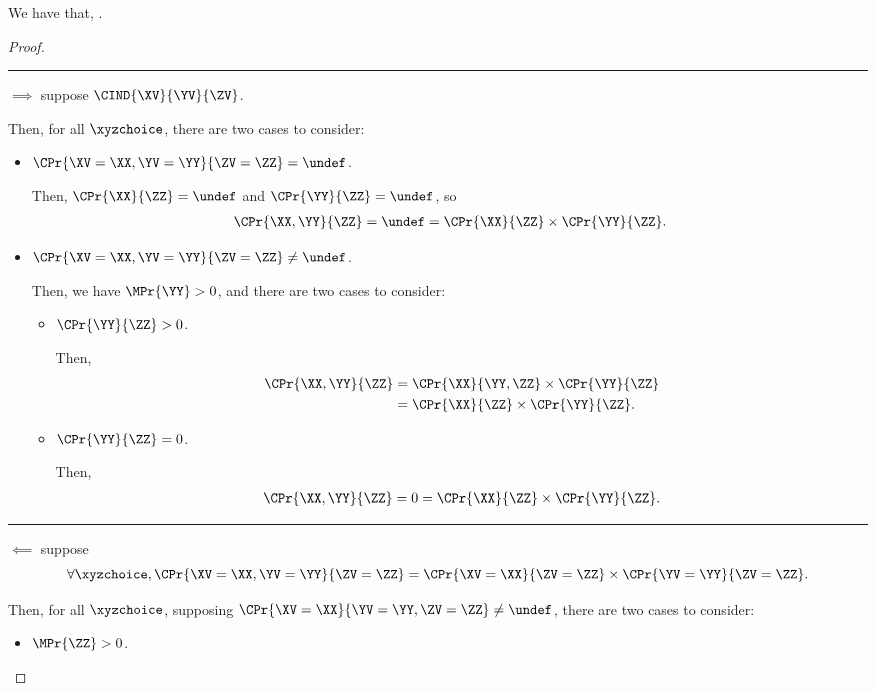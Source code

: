 \begin{proposition}
  We have that, \indproddef.%
\end{proposition}

\begin{proof}
  \hrule
  $\implies$ suppose $\CIND{\XV}{\YV}{\ZV}$.

  Then, for all $\xyzchoice$, there are two cases to consider:
  \begin{itemize}
    \item $\CPr{\XV = \XX, \YV = \YY}{\ZV = \ZZ} = \undef$.

      Then, 
      $\CPr{\XX}{\ZZ} = \undef$
      and
      $\CPr{\YY}{\ZZ} = \undef$, so
      \begin{align*}
        \CPr{\XX, \YY}{\ZZ}  = \undef =
        \CPr{\XX}{\ZZ} \times \CPr{\YY}{\ZZ}.
      \end{align*}
    \item $\CPr{\XV = \XX, \YV = \YY}{\ZV = \ZZ} \ne \undef$.

      Then, we have $\MPr{\YY} > 0$, and there are two cases to consider:
      \begin{itemize}
        \item $\CPr{\YY}{\ZZ} > 0$.

        Then,
        \begin{align*}
          \CPr{\XX, \YY}{\ZZ} 
          &= \CPr{\XX}{\YY, \ZZ} \times \CPr{\YY}{\ZZ}\\
          &= \CPr{\XX}{\ZZ} \times \CPr{\YY}{\ZZ}.
        \end{align*}

        \item $\CPr{\YY}{\ZZ} = 0$.

        Then,
        \begin{align*}
          \CPr{\XX, \YY}{\ZZ} = 0 
          = \CPr{\XX}{\ZZ} \times \CPr{\YY}{\ZZ}.
        \end{align*}
      \end{itemize}
  \end{itemize}

  \hrule
  $\impliedby$ suppose 
  $$\forall \xyzchoice,
  \CPr{\XV = \XX, \YV = \YY}{\ZV = \ZZ} = 
  \CPr{\XV = \XX}{\ZV = \ZZ}
  \times
  \CPr{\YV = \YY}{\ZV = \ZZ}.$$

  Then, for all $\xyzchoice$, supposing $\CPr{\XV = \XX}{\YV = \YY, \ZV = \ZZ} \ne \undef$, there are two cases to consider:
  \begin{itemize}
    \item $\MPr{\ZZ} > 0$.


\end{itemize}
\end{proof}
